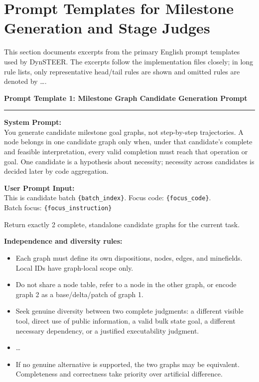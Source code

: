 \section{Prompt Templates for Milestone Generation and Stage Judges}
\label{app:prompts}

This section documents excerpts from the primary English prompt templates used by DynSTEER. The excerpts follow the implementation files closely; in long rule lists, only representative head/tail rules are shown and omitted rules are denoted by \ldots{}.

\begin{tcolorbox}[colback=gray!4,colframe=black!75,arc=4pt,boxrule=0.8pt,left=8pt,right=8pt,top=6pt,bottom=6pt]
\textbf{Prompt Template 1: Milestone Graph Candidate Generation Prompt} \\[-6pt]
\rule{\textwidth}{0.4pt}
\small
\textbf{System Prompt:} \\
You generate candidate milestone goal graphs, not step-by-step trajectories. A node belongs in one candidate graph only when, under that candidate's complete and feasible interpretation, every valid completion must reach that operation or goal. One candidate is a hypothesis about necessity; necessity across candidates is decided later by code aggregation.

\textbf{User Prompt Input:} \\
This is candidate batch \texttt{\{batch\_index\}}. Focus code: \texttt{\{focus\_code\}}. \\
Batch focus: \texttt{\{focus\_instruction\}}

Return exactly 2 complete, standalone candidate graphs for the current task.

\textbf{Independence and diversity rules:}
\begin{itemize}[leftmargin=*,itemsep=1pt,topsep=1pt]
  \item Each graph must define its own dispositions, nodes, edges, and minefields. Local IDs have graph-local scope only.
  \item Do not share a node table, refer to a node in the other graph, or encode graph 2 as a base/delta/patch of graph 1.
  \item Seek genuine diversity between two complete judgments: a different visible tool, direct use of public information, a valid bulk state goal, a different necessary dependency, or a justified executability judgment.
  \item \ldots{}
  \item If no genuine alternative is supported, the two graphs may be equivalent. Completeness and correctness take priority over artificial difference.
\end{itemize}


\end{tcolorbox}
